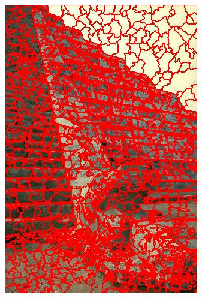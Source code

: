 \begin{figure}
{		\includegraphics[scale=\scalefivebsdtest]{pictures/bsd-test-6-qs}
	}
	\subfigure{
}
\end{figure}
